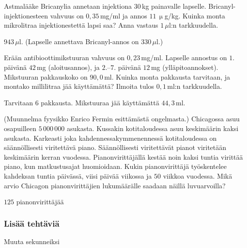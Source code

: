 \begin{tehtavasivu}

\begin{tehtava}
Astmalääke Bricanylia annetaan injektiona $30$\,kg painavalle lapselle. Bricanyl-injektionesteen vahvuus on $0,35$\,mg/ml ja annos $11$\,$\upmu$g/kg. Kuinka monta mikrolitraa injektionestettä lapsi saa? Anna vastaus $1$\,$\mu$l:n tarkkuudella. %
 	\begin{vastaus}
$943$\,$\mu$l. (Lapselle annettava Bricanyl-annos on $330$\,$\mu$l.) %
	\end{vastaus}
\end{tehtava}

\begin{tehtava}
Erään antibioottimikstuuran vahvuus on $0,23$\,mg/ml. Lapselle annostus on $1.$ päivänä $42$\,mg (aloitusannos), ja $2$.--$7$. päivänä $12$\,mg (ylläpitoannokset). Mikstuuran pakkauskoko on $90,0$\,ml. Kuinka monta pakkausta tarvitaan, ja montako millilitraa jää käyttämättä? Ilmoita tulos $0,1$\,ml:n tarkkuudella.
 \begin{vastaus}
Tarvitaan $6$ pakkausta. Mikstuuraa jää käyttämättä $44,3$\,ml.
 \end{vastaus}
\end{tehtava}

\begin{tehtava}
(Muunnelma fyysikko Enrico Fermin esittämästä ongelmasta.) Chicagossa asuu osapuilleen $5\,000\,000$ asukasta. Kussakin kotitaloudessa asuu keskimäärin kaksi asukasta. Karkeasti joka kahdennessakymmenennessä kotitaloudessa on säännöllisesti viritettävä piano. Säännöllisesti viritettävät pianot viritetään keskimäärin kerran vuodessa. Pianonvirittäjällä kestää noin kaksi tuntia virittää piano, kun matkustusajat huomioidaan. Kukin pianonvirittäjä työskentelee kahdeksan tuntia päivässä, viisi päivää viikossa ja $50$ viikkoa vuodessa. Mikä arvio Chicagon pianonvirittäjien lukumäärälle saadaan näillä luvuarvoilla?
	\begin{vastaus}
$125$ pianonvirittäjää
	\end{vastaus}
\end{tehtava}

\subsubsection*{Lisää tehtäviä}

\begin{tehtava}
Muuta sekunneiksi
	\begin{vastaus}
	\end{vastaus}
\end{tehtava}


\end{tehtavasivu}
